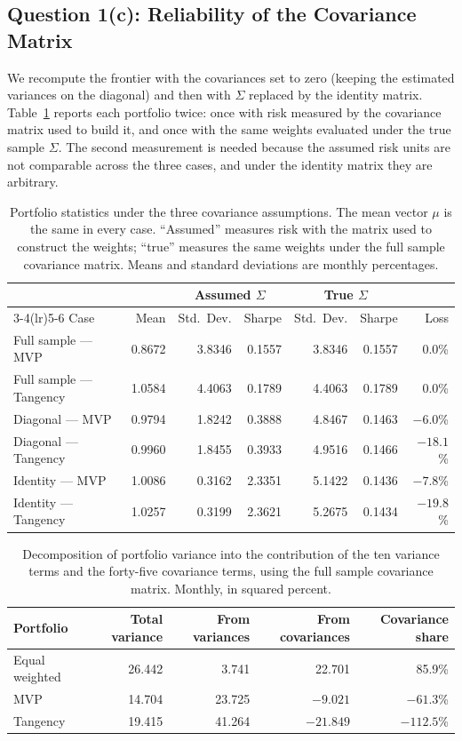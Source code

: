 \documentclass[11pt]{article}
\begin{document}
\subsection{Question 1(c): Reliability of the Covariance Matrix}

We recompute the frontier with the covariances set to zero (keeping the
estimated variances on the diagonal) and then with $\Sigma$ replaced by the
identity matrix. Table~\ref{tab:q1c} reports each portfolio twice: once with
risk measured by the covariance matrix used to build it, and once with the
same weights evaluated under the true sample $\Sigma$. The second measurement
is needed because the assumed risk units are not comparable across the three
cases, and under the identity matrix they are arbitrary.

\begin{table}[H]
\centering
\caption{Portfolio statistics under the three covariance assumptions. The mean
vector $\mu$ is the same in every case. ``Assumed'' measures risk with the
matrix used to construct the weights; ``true'' measures the same weights under
the full sample covariance matrix. Means and standard deviations are monthly
percentages.}
\begin{tabular}{lrrrrrr}
\toprule
 & & \multicolumn{2}{c}{Assumed $\Sigma$} & \multicolumn{2}{c}{True $\Sigma$} & \\
\cmidrule(lr){3-4}\cmidrule(lr){5-6}
Case & Mean & Std.\ Dev. & Sharpe & Std.\ Dev. & Sharpe & Loss \\
\midrule
Full sample --- MVP & 0.8672 & 3.8346 & 0.1557 & 3.8346 & 0.1557 & 0.0\% \\
Full sample --- Tangency & 1.0584 & 4.4063 & 0.1789 & 4.4063 & 0.1789 & 0.0\% \\
Diagonal --- MVP & 0.9794 & 1.8242 & 0.3888 & 4.8467 & 0.1463 & $-6.0$\% \\
Diagonal --- Tangency & 0.9960 & 1.8455 & 0.3933 & 4.9516 & 0.1466 & $-18.1$\% \\
Identity --- MVP & 1.0086 & 0.3162 & 2.3351 & 5.1422 & 0.1436 & $-7.8$\% \\
Identity --- Tangency & 1.0257 & 0.3199 & 2.3621 & 5.2675 & 0.1434 & $-19.8$\% \\
\bottomrule
\end{tabular}
\label{tab:q1c}
\end{table}

\begin{table}[H]
\centering
\caption{Decomposition of portfolio variance into the contribution of the ten
variance terms and the forty-five covariance terms, using the full sample
covariance matrix. Monthly, in squared percent.}
\begin{tabular}{lrrrr}
\toprule
Portfolio & Total variance & From variances & From covariances & Covariance share \\
\midrule
Equal weighted & 26.442 & 3.741 & 22.701 & 85.9\% \\
MVP & 14.704 & 23.725 & $-9.021$ & $-61.3$\% \\
Tangency & 19.415 & 41.264 & $-21.849$ & $-112.5$\% \\
\bottomrule
\end{tabular}
\label{tab:q1c_decomp}
\end{table}
\end{document}
